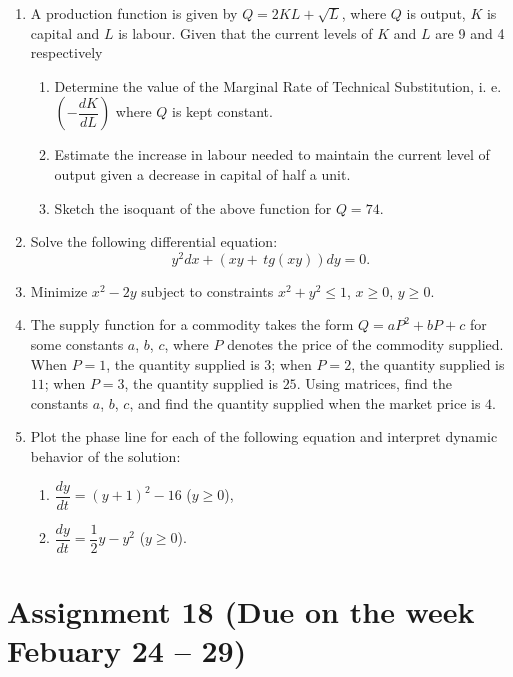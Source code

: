 \documentclass[12pt]{article} %
\theoremstyle{definition} %
\begin{document}
\begin{enumerate}
\item A production function is given by $Q=2KL+\sqrt{L}$, where $Q$ is output, $K$ is capital and $L$ is labour. Given that the current levels of $K$ and $L$ are 9 and 4 respectively
    \begin{enumerate}
    \item Determine the value of the Marginal Rate of Technical Substitution, i. e. $\left(-\dfrac{dK}{dL}\right)$ where $Q$ is kept constant.
    \item Estimate the increase in labour needed to maintain the current level of output given a decrease in capital of half a unit.
    \item Sketch the isoquant of the above function for $Q = 74$.
\end{enumerate}

\item Solve the following differential equation: 
\[
	y^2dx+(xy+\mathrm\,{tg}(xy))dy=0.
\]

\item Minimize $x^2-2y$ subject to constraints $x^2+y^2\leqslant 1$, $x\geqslant 0$, $y\geqslant 0$.

\item The supply function for a commodity takes the form $Q=aP^2+bP+c$ for some constants $a$, $b$, $c$, where $P$ denotes the price of the commodity supplied. When $P = 1$, the quantity supplied is $3$; when $P =2$, the quantity supplied is $11$; when $P = 3$, the quantity supplied is $25$. Using matrices, find the constants $a$, $b$, $c$, and find the quantity supplied when the market price is $4$.

\item Plot the phase line for each of the following equation and interpret dynamic behavior of the solution:
\begin{enumerate}
\item $\dfrac{dy}{dt}=(y+1)^2-16$ ($y\geqslant 0$),
\item $\dfrac {dy}{dt}=\dfrac 12y-y^2$ ($y\geqslant 0$).
\end{enumerate}
\end{enumerate}



\section{Assignment 18 (Due on the week Febuary 24 – 29)}
\end{document}
